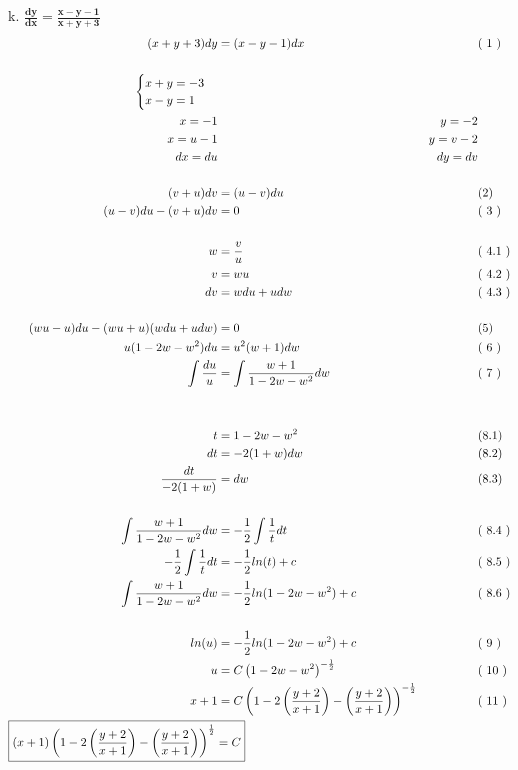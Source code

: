 \documentclass{article}
\newcommand{\newLine}[3]{ #1 & = #2 && \text{(#3)}\\ }
\newcommand{\finalAnswer}[2]{ \Aboxed{ #1 & = #2 } }
\newcommand{\p}[1]{ \left( #1 \right) }
\newcommand{\newProblem}[2]{ \hspace{10mm} #1. $
\boldsymbol{ #2 }
$  \break }
\begin{document}
\begin{flushleft}
        \newProblem{k}{ \frac{dy}{dx} = \frac{ x-y-1 }{ x+y+3 } }
        \begin{align*}
            \newLine{ ( x+y+3 )dy } { (x-y-1)dx } { 1 }
            \\
                \begin{cases}
                    x+y = -3\\
                    x-y = 1
                \end{cases}\\
            x = -1 && y = -2 \\
            x = u - 1 && y = v -2 \\
            dx = du && dy = dv\\
            \\
            \newLine{ (v+u)dv } { (u-v)du } {2}
            \newLine{ (u-v)du - ( v+u )dv } { 0 } { 3 }
            \\
            \newLine{ w } { \frac{v}{u} } { 4.1 }
            \newLine{ v } { wu } { 4.2 }
            \newLine{ dv } { wdu + udw } { 4.3 }
            \\
            \newLine{ (wu-u)du - (wu+u)(wdu+udw) } { 0 } {5}
            \newLine{ u(1-2w-w^2)du } { u^2(w+1)dw } { 6 }
            \newLine{ \int \frac{du}{u} } { \int \frac{w+1}{1-2w-w^2} dw } { 7 }
            \\
                \\
                \newLine{t}{1-2w-w^2}{8.1}
                \newLine{dt}{-2(1+w)dw}{8.2}
                \newLine{\frac{dt}{-2(1+w)}}{dw}{8.3}
                \\
                \newLine{ \int \frac{w+1}{1-2w-w^2} dw } { -\frac{1}{2} \int \frac{1}{t} dt } { 8.4 }
                \newLine{ -\frac{1}{2} \int \frac{1}{t} dt }{ -\frac{1}{2} ln(t) + c}{ 8.5 }
                \newLine{ \int \frac{w+1}{1-2w-w^2} dw } { -\frac{1}{2} ln(1-2w-w^2) + c } { 8.6 }
            \\
            \newLine{ ln(u) } { -\frac{1}{2} ln(1-2w-w^2) + c} { 9 }
            \newLine{ u } { C\p{1-2w-w^2}^{-\frac{1}{2}} } { 10 }
            \newLine{ x+1 } { C\p{1-2\p{\frac{y+2}{x+1}}-\p{\frac{y+2}{x+1}}}^{-\frac{1}{2}} } { 11 }
            \finalAnswer{ \p{x+1} \p{1-2\p{\frac{y+2}{x+1}}-\p{\frac{y+2}{x+1}}}^{\frac{1}{2}} }{ C }
        \end{align*}


\end{flushleft}
\end{document}
